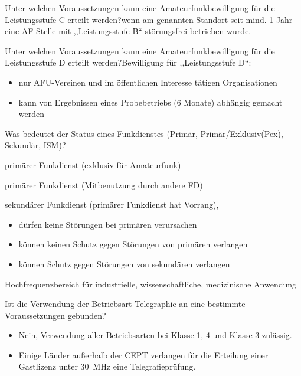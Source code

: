 \documentclass[avery5371,grid,frame,a4paper]{flashcards}
\newcommand{\card}[3]{
  \begin{flashcard}[{\chap} -- #1]{#2}#3\end{flashcard}
}
\begin{document}
\card{43}{Unter welchen Voraussetzungen kann eine Amateurfunkbewilligung für die Leistungsstufe C erteilt werden?}{wenn am genannten Standort seit mind. 1 Jahr eine AF-Stelle mit ,,Leistungsstufe B`` störungsfrei betrieben wurde.}

\card{44}{Unter welchen Voraussetzungen kann eine Amateurfunkbewilligung für die Leistungsstufe D erteilt werden?}{Bewilligung für ,,Leistungsstufe D``: \begin{itemize}\itemsep1pt \item nur AFU-Vereinen und im öffentlichen Interesse tätigen Organisationen \item kann von Ergebnissen eines Probebetriebs (6 Monate) abhängig gemacht werden\end{itemize}}

\card{45}{Was bedeutet der Status eines Funkdienstes (Primär, Primär/Exklusiv(Pex), Sekundär, ISM)?}{
 \footnotesize
  \begin{description}\itemsep0pt
    \item[Pex] primärer Funkdienst (exklusiv für Amateurfunk)
    \item[P] primärer Funkdienst (Mitbenutzung durch andere FD)
    \item[S] sekundärer Funkdienst (primärer Funkdienst hat Vorrang),
      \begin{itemize}[leftmargin=0pt,itemsep=0pt]
        \item dürfen keine Störungen bei primären verursachen
        \item können keinen Schutz gegen Störungen von primären verlangen
        \item können Schutz gegen Störungen von sekundären verlangen
      \end{itemize}
    \item[ISM] Hochfrequenzbereich für industrielle, wissenschaftliche, medizinische Anwendung
  \end{description}
}

\card{46}{Ist die Verwendung der Betriebsart Telegraphie an eine bestimmte Voraussetzungen gebunden?}{\begin{itemize}\itemsep1pt \item Nein, Verwendung aller Betriebsarten bei Klasse 1, 4 und Klasse 3 zulässig. \item Einige Länder außerhalb der CEPT verlangen für die Erteilung einer Gastlizenz
unter \SI{30}{\mega\Hz} eine Telegrafieprüfung.\end{itemize}}
\end{document}
